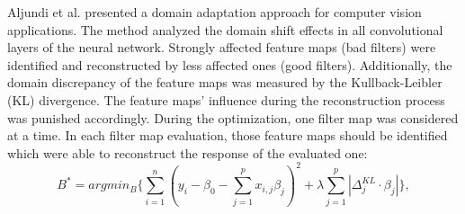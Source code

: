 \begin{comment}
\begin{figure}[H]
  \centering
  \texttt{[image: models\_state\_of\_the\_art/DCAN\_model.pdf]}
  \caption{DCAN architecture proposed by Li et al. \cite{li2020}}
  \label{fig:DCAN_model}
\end{figure}

\end{comment}

Aljundi et al. \cite{Aljundi2016} presented a domain adaptation approach for computer vision applications. The method analyzed the domain shift effects in all convolutional layers of the neural network. Strongly affected feature maps (bad filters) were identified and reconstructed by less affected ones (good filters). Additionally, the domain discrepancy of the feature maps was measured by the Kullback-Leibler (KL) divergence. The feature maps' influence during the reconstruction process was punished accordingly. During the optimization, one filter map was considered at a time. In each filter map evaluation, those feature maps should be identified which were able to reconstruct the response of the evaluated one:
\begin{equation}
    B^{*} = argmin_{B} \{ \sum_{i=1}^{n}( y_{i}-\beta_{0}-\sum_{j=1}^{p}x_{i,j}\beta_{j})^{2} + \lambda \sum_{j=1}^{p}|\Delta_{j}^{KL}\cdot \beta_{j}| \},
\end{equation}
